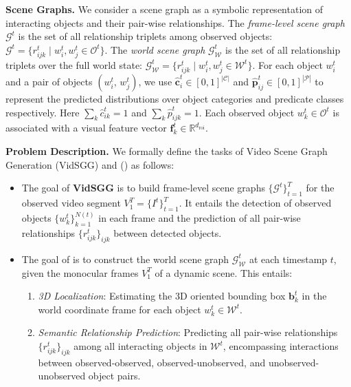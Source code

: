 \vspace{1mm}
\noindent\textbf{Scene Graphs.} We consider a scene graph as a symbolic representation of interacting
objects
and their pair-wise relationships. The \emph{frame-level scene graph} $\mathcal{G}^{t}$ is the set
of all relationship triplets among observed objects: $\mathcal{G}^{t} = \{r_{ijk}^{t} \mid
w_{i}^{t}, w_{j}^{t} \in \mathcal{O}^{t}\}$. The \emph{world scene graph}
$\mathcal{G}_{\mathcal{W}}^{t}$ is the set of all relationship triplets over the full world state:
$\mathcal{G}_{\mathcal{W}}^{t} = \{r_{ijk}^{t} \mid w_{i}^{t}, w_{j}^{t} \in \mathcal{W}^{t}\}$. For
each object $w_{i}^{t}$ and a pair of objects $\left(w_{i}^{t},\, w_{j}^{t}\right)$, we use
$\hat{\mathbf{c}}_{i}^{t} \in \left[0,1\right]^{|\mathcal{C}|}$ and $\hat{\mathbf{p}}_{ij}^{t} \in
\left[0,1\right]^{|\mathcal{P}|}$ to represent the predicted distributions over object categories
and predicate classes respectively. Here $\sum_{k} \hat{c}_{ik}^{t} = 1$ and $\sum_{k}
\hat{p}_{ijk}^{t} = 1$. Each observed object $w_{k}^{t} \in \mathcal{O}^{t}$ is associated with a
visual feature vector $\mathbf{f}_{k}^{t} \in \mathbb{R}^{d_{\text{roi}}}$.

\vspace{1mm}
\noindent\textbf{Problem Description.} We formally define the tasks of Video Scene Graph Generation
(VidSGG)
and \WorldSGG{} (\WSGG{}) as follows:

\begin{itemize}[nosep]
    \item [--] The goal of \textbf{VidSGG} is to build frame-level scene graphs
    $\{\mathcal{G}^{t}\}_{t=1}^{T}$ for the observed video segment
    $V_{1}^{T} = \{I^{t}\}_{t=1}^{T}$.  It entails the detection of observed objects
    $\{w_{k}^{t}\}_{k=1}^{N(t)}$ in each frame and the prediction of all pair-wise relationships
    $\{r_{ijk}^{t}\}_{ijk}$ between detected objects.
    \item [--] The goal of \textbf{\WSGG{}} is to construct the world scene graph
    $\mathcal{G}_{\mathcal{W}}^{t}$ at each timestamp $t$, given the monocular frames
    $V_{1}^{T}$ of a dynamic scene.  This entails:
    \begin{enumerate}[label=(\alph*)]
        \item \emph{3D Localization}: Estimating the 3D oriented bounding box $\mathbf{b}_{k}^{t}$
        in the world coordinate frame for each object $w_{k}^{t} \in \mathcal{W}^{t}$.
        \item \emph{Semantic Relationship Prediction}: Predicting all pair-wise relationships
        $\{r_{ijk}^{t}\}_{ijk}$ among all interacting objects in $\mathcal{W}^{t}$, encompassing
        interactions between observed-observed, observed-unobserved, and unobserved-unobserved object pairs.
    \end{enumerate}
\end{itemize}

